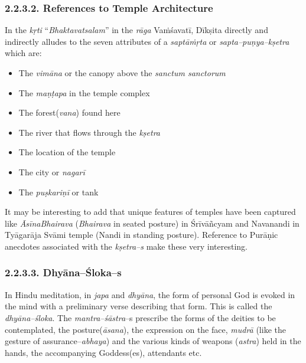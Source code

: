 \subsubsection*{2.2.3.2. References to Temple Architecture}

In the \textit{kṛti} “\textit{Bhaktavatsalam}” in the \textit{rāga} Vaṁśavatī, Dīkṣita directly and indirectly alludes to the seven attributes of a \textit{saptāṁṛta} or \textit{sapta–puṇya–kṣetra} which are:

\begin{itemize}
\item The \textit{vimāna} or the canopy above the \textit{sanctum sanctorum}

 \item The \textit{maṇṭapa} in the temple complex

 \item The forest(\textit{vana}) found here

 \item The river that flows through the \textit{kṣetra}

 \item The location of the temple

 \item The city or \textit{nagarī}

 \item The \textit{puṣkariṇī} or tank

\end{itemize}

It may be interesting to add that unique features of temples have been captured like \textit{ĀsīnaBhairava} (\textit{Bhairava} in seated posture) in Śrīvāñcyam and Navanandi in Tyāgarāja Svāmi temple (Nandi in standing posture). Reference to Purāṇic anecdotes associated with the \textit{kṣetra–s} make these very interesting.


\subsubsection*{2.2.3.3. Dhyāna–Śloka–s}

In Hindu meditation, in \textit{japa} and \textit{dhyāna}, the form of personal God is evoked in the mind with a preliminary verse describing that form. This is called the \textit{dhyāna–śloka}. The \textit{mantra–śāstra}–s prescribe the forms of the deities to be contemplated, the posture(\textit{āsana}), the expression on the face, \textit{mudrā} (like the gesture of assurance–\textit{abhaya}) and the various kinds of weapons (\textit{astra}) held in the hands, the accompanying Goddess(es), attendants etc.

